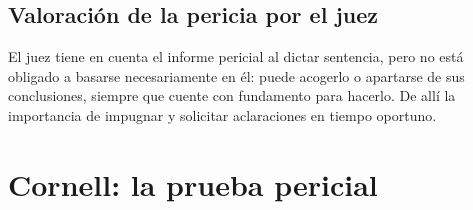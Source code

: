 \documentclass[12pt,oneside]{book}
\begin{document}
\subsection{Valoración de la pericia por el juez}

\begin{important}
El juez tiene en cuenta el informe pericial al dictar sentencia, pero no está obligado a basarse necesariamente en él: puede acogerlo o apartarse de sus conclusiones, siempre que cuente con fundamento para hacerlo. De allí la importancia de impugnar y solicitar aclaraciones en tiempo oportuno.
\end{important}

\section*{Cornell: la prueba pericial}
\end{document}
